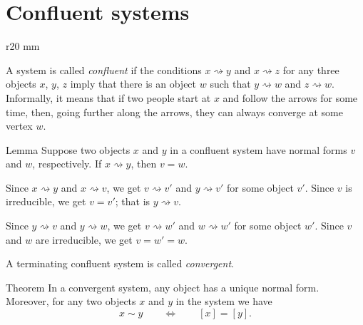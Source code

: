 \section{Confluent systems}

\begin{wrapfigure}{r}{20 mm}
\vskip-0mm
\centering
{}
\vskip-0mm
\end{wrapfigure}

A system is called \emph{confluent} if the conditions $x\rightsquigarrow  y$ and $x\rightsquigarrow  z$
for any three objects $x$, $y$, $z$ imply that
there is an object $w$ such that $y\rightsquigarrow  w$ and $z\rightsquigarrow  w$.
Informally, it means that if two people start at $x$ and follow the arrows for some time,
then, going further along the arrows, they can always converge at some vertex $w$.


\begin{thm}{Lemma}\label{lem:x->y}
Suppose two objects $x$ and $y$ in a confluent system have normal forms 
$v$ and $w$, respectively.
If $x\rightsquigarrow y$, then $v=w$.
\end{thm}

Since $x\rightsquigarrow y$ and $x\rightsquigarrow v$, we get $v\rightsquigarrow v'$ and $y\rightsquigarrow v'$ for some object $v'$.
Since $v$ is irreducible, we get $v=v'$;
that is $y\rightsquigarrow v$.

Since $y\rightsquigarrow v$ and $y\rightsquigarrow w$, we get $v\rightsquigarrow w'$ and $w\rightsquigarrow w'$ for some object $w'$.
Since $v$ and $w$ are irreducible, we get $v=w'=w$.
\qeds

A terminating confluent system is called \emph{convergent}.

\begin{thm}{Theorem}
In a convergent system, any object has a unique normal form.
Moreover, for any two objects $x$ and $y$ in the system we have
\[x\sim y\qquad\Longleftrightarrow\qquad [x]=[y].\]

\end{thm}

